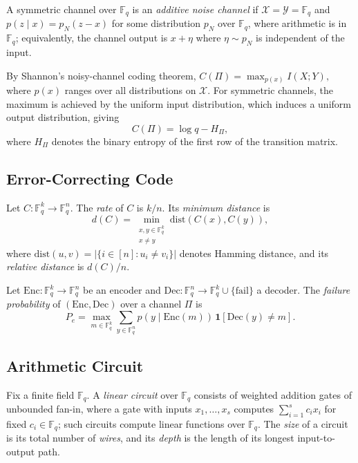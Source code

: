\documentclass[11pt]{article}
\newcommand{\dec}{\mathrm{Dec}}
\newcommand{\enc}{\mathrm{Enc}}
\theoremstyle{named}
\begin{document}
A symmetric channel over $\mathbb{F}_q$ is an \emph{additive noise channel} 
if $\mathcal{X} = \mathcal{Y} = \mathbb{F}_q$ and $p(z \mid x) = p_N(z - x)$ 
for some distribution $p_N$ over $\mathbb{F}_q$, where arithmetic is in 
$\mathbb{F}_q$; equivalently, the channel output is $x + \eta$ where 
$\eta \sim p_N$ is independent of the input.

By Shannon's noisy-channel coding theorem,
$
C(\Pi) = \max_{p(x)} I(X;Y),
$
where $p(x)$ ranges over all distributions on $\mathcal{X}$. For symmetric channels, the maximum is achieved by the uniform input distribution, which induces a uniform output distribution, giving
\begin{equation}
\label{equ:sym_channel_capacity}
C(\Pi) = \log q - H_\Pi,
\end{equation}
where $H_\Pi$ denotes the binary entropy of the first row of the transition matrix.

\subsection{Error-Correcting Code}

Let $C : \mathbb{F}_q^{k} \to \mathbb{F}_q^{n}$. The \emph{rate} of $C$ is $k/n$. Its \emph{minimum distance} is
\[
d(C) = \min_{\substack{x, y \in \mathbb{F}_q^k \\ x \ne y}} \mathrm{dist}(C(x),C(y)),
\]
where $\mathrm{dist}(u,v) = |\{i \in [n] : u_i \ne v_i\}|$ denotes Hamming distance, and its \emph{relative distance} is $d(C)/n$.

Let $\enc:\mathbb{F}_q^{k} \to \mathbb{F}_q^{n}$ be an encoder and $\dec:\mathbb{F}_q^{n} \to \mathbb{F}_q^{k} \cup \{\text{fail}\}$ a decoder. The \emph{failure probability} of $(\enc, \dec)$ over a channel $\Pi$ is
\[
P_e = \max_{m \in \mathbb{F}_q^k} \sum_{y \in \mathbb{F}_q^n} p(y \mid \enc(m))\, \mathbf{1}[\dec(y) \neq m].
\]


\subsection{Arithmetic Circuit}

Fix a finite field $\mathbb{F}_q$. A \emph{linear circuit} over $\mathbb{F}_q$ consists of weighted addition gates of unbounded fan-in, where a gate with inputs $x_1,\dots,x_s$ computes $\sum_{i=1}^s c_i x_i$ for fixed $c_i \in \mathbb{F}_q$; such circuits compute linear functions over $\mathbb{F}_q$. The \emph{size} of a circuit is its total number of \emph{wires}, and its \emph{depth} is the length of its longest input-to-output path.
\end{document}
